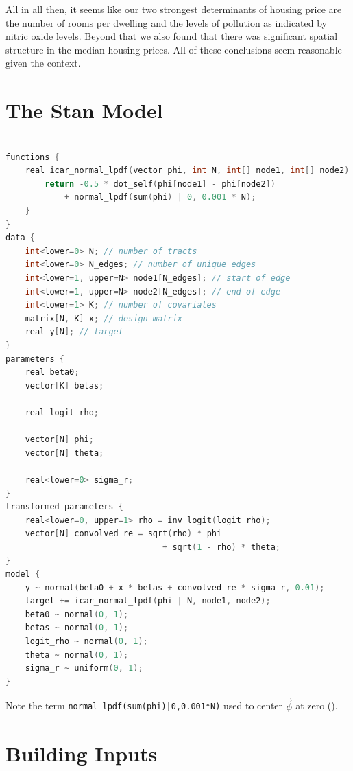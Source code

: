 \documentclass[11pt]{article}
\begin{document}
All in all then, it seems like our two strongest determinants of housing price are the number of rooms per dwelling and the levels of pollution as indicated by nitric oxide levels. Beyond that we also found that there was significant spatial structure in the median housing prices. All of these conclusions seem reasonable given the context. 

\newpage


\section{The Stan Model} \label{stanmodel}

\begin{lstlisting}[language=C++, basicstyle=\small]

functions {
    real icar_normal_lpdf(vector phi, int N, int[] node1, int[] node2) {
        return -0.5 * dot_self(phi[node1] - phi[node2]) 
            + normal_lpdf(sum(phi) | 0, 0.001 * N);
    }
}
data {
    int<lower=0> N; // number of tracts
    int<lower=0> N_edges; // number of unique edges
    int<lower=1, upper=N> node1[N_edges]; // start of edge
    int<lower=1, upper=N> node2[N_edges]; // end of edge
    int<lower=1> K; // number of covariates
    matrix[N, K] x; // design matrix
    real y[N]; // target
}
parameters {
    real beta0;
    vector[K] betas;

    real logit_rho;

    vector[N] phi;
    vector[N] theta;

    real<lower=0> sigma_r;
}
transformed parameters {
    real<lower=0, upper=1> rho = inv_logit(logit_rho);
    vector[N] convolved_re = sqrt(rho) * phi 
                                + sqrt(1 - rho) * theta;
}
model {
    y ~ normal(beta0 + x * betas + convolved_re * sigma_r, 0.01);
    target += icar_normal_lpdf(phi | N, node1, node2);
    beta0 ~ normal(0, 1);
    betas ~ normal(0, 1);
    logit_rho ~ normal(0, 1);
    theta ~ normal(0, 1);
    sigma_r ~ uniform(0, 1);
}

\end{lstlisting}

Note the term \verb+normal_lpdf(sum(phi)|0,0.001*N)+ used to center $\vec{\phi}$ at zero (\cite{bymstan}). 


\section{Building Inputs} \label{inputs}
\end{document}
